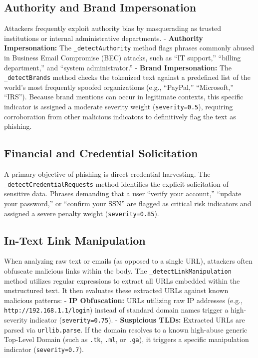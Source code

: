 \subsection{Authority and Brand
Impersonation}\label{authority-and-brand-impersonation}

Attackers frequently exploit authority bias by masquerading as trusted
institutions or internal administrative departments. - \textbf{Authority
Impersonation:} The \texttt{\_detectAuthority} method flags phrases
commonly abused in Business Email Compromise (BEC) attacks, such as ``IT
support,'' ``billing department,'' and ``system administrator.'' -
\textbf{Brand Impersonation:} The \texttt{\_detectBrands} method checks
the tokenized text against a predefined list of the world's most
frequently spoofed organizations (e.g., ``PayPal,'' ``Microsoft,''
``IRS''). Because brand mentions can occur in legitimate contexts, this
specific indicator is assigned a moderate severity weight
(\texttt{severity=0.5}), requiring corroboration from other malicious
indicators to definitively flag the text as phishing.

\subsection{Financial and Credential
Solicitation}\label{financial-and-credential-solicitation}

A primary objective of phishing is direct credential harvesting. The
\texttt{\_detectCredentialRequests} method identifies the explicit
solicitation of sensitive data. Phrases demanding that a user ``verify
your account,'' ``update your password,'' or ``confirm your SSN'' are
flagged as critical risk indicators and assigned a severe penalty weight
(\texttt{severity=0.85}).

\subsection{In-Text Link
Manipulation}\label{in-text-link-manipulation}

When analyzing raw text or emails (as opposed to a single URL),
attackers often obfuscate malicious links within the body. The
\texttt{\_detectLinkManipulation} method utilizes regular expressions to
extract all URLs embedded within the unstructured text. It then
evaluates these extracted URLs against known malicious patterns: -
\textbf{IP Obfuscation:} URLs utilizing raw IP addresses (e.g.,
\texttt{http://192.168.1.1/login}) instead of standard domain names
trigger a high-severity indicator (\texttt{severity=0.75}). -
\textbf{Suspicious TLDs:} Extracted URLs are parsed via
\texttt{urllib.parse}. If the domain resolves to a known high-abuse
generic Top-Level Domain (such as \texttt{.tk}, \texttt{.ml}, or
\texttt{.ga}), it triggers a specific manipulation indicator
(\texttt{severity=0.7}).

